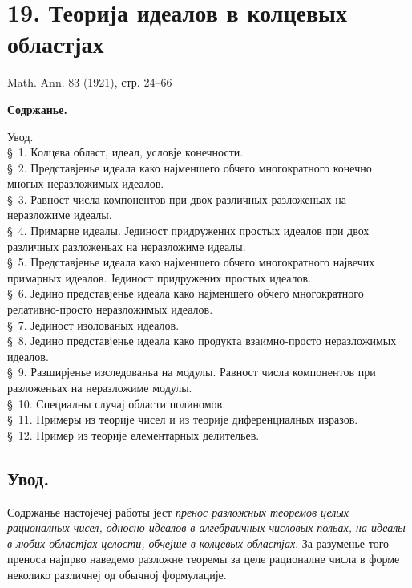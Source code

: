 ﻿\documentclass[11pt]{article}
\begin{document}

\setcounter{footnote}{0}
\section*{19. Теорија идеалов в колцевых областјах}
\begin{center}
Math. Ann. 83 (1921), стр. 24--66
\end{center}

\begin{center}\textbf{Содржанье.}\end{center}
\noindent Увод.\\
\S~1. Колцева област, идеал, условје конечности.\\
\S~2. Представјенье идеала како најменшего обчего многократного конечно многых неразложимых идеалов.\\
\S~3. Равност числа компонентов при двох различных разложеньах на неразложиме идеалы.\\
\S~4. Примарне идеалы. Јединост придружених простых идеалов при двох различных разложеньах на неразложиме идеалы.\\
\S~5. Представјенье идеала како најменшего обчего многократного највечих примарных идеалов. Јединост придружених простых идеалов.\\
\S~6. Једино представјенье идеала како најменшего обчего многократного релативно-просто неразложимых идеалов.\\
\S~7. Јединост изолованых идеалов.\\
\S~8. Једино представјенье идеала како продукта взаимно-просто неразложимых идеалов.\\
\S~9. Разширјенье изследованьа на модулы. Равност числа компонентов при разложеньах на неразложиме модулы.\\
\S~10. Специалны случај области полиномов.\\
\S~11. Примеры из теорије чисел и из теорије диференциалных изразов.\\
\S~12. Пример из теорије елементарных делительев.

\subsection*{Увод.}
Содржанье настојечеј работы јест \emph{пренос разложных теоремов целых рационалных чисел, односно идеалов в алгебраичных числовых польах, на идеалы в любих областјах целости, обчејше в колцевых областјах}. За разуменье того преноса најпрво наведемо разложне теоремы за целе рационалне числа в форме неколико различнеј од обычној формулације.
\end{document}
